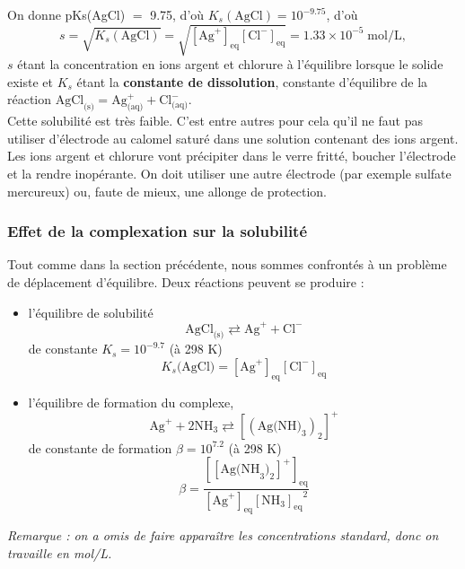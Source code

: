 \documentclass[11pt,a4paper]{report}
\begin{document}
On donne pKs(AgCl) $=$ 9.75, d'où $K_s(\text{AgCl}) = 10^{-9.75}$, d'où
\begin{equation}
	s = \sqrt{K_s(\text{AgCl})} = \sqrt{[\text{Ag}^+]_\text{eq}[\text{Cl}^-]_\text{eq}}
	= 1.33\times10^{-5}\;\text{mol/L},
\end{equation}
$s$ étant la concentration en ions argent et chlorure à l'équilibre lorsque le solide existe et
$K_s$ étant la \textbf{constante de dissolution}, constante d'équilibre de la réaction
$\text{AgCl}_\text{(s)} = \text{Ag}^+_\text{(aq)} + \text{Cl}^-_\text{(aq)}$.\\

Cette solubilité est très faible. C'est entre autres pour cela qu'il ne faut pas utiliser d'électrode au calomel saturé dans une solution contenant des ions argent. Les ions argent et chlorure vont précipiter dans le verre fritté, boucher l'électrode et la rendre inopérante. On doit utiliser une autre électrode (par exemple sulfate mercureux) ou, faute de mieux, une allonge de protection.

\subsubsection*{Effet de la complexation sur la solubilité}

Tout comme dans la section précédente, nous sommes confrontés à un problème de déplacement d'équilibre. Deux réactions peuvent se produire :
\begin{itemize}
	\item l'équilibre de solubilité
		\begin{equation}
			\text{AgCl}_\text{(s)} \rightleftarrows \text{Ag}^+ + \text{Cl}^-
		\end{equation}
		de constante $K_s = 10^{-9.7}$ (à 298 K)
		\begin{equation}
			\boxed{K_s(\text{AgCl)} = [\text{Ag}^+]_\text{eq}[\text{Cl}^-]_\text{eq}}
		\end{equation}
	\item l'équilibre de formation du complexe,
		\begin{equation}
			\text{Ag}^+ + 2\text{NH}_3 \rightleftarrows [(\text{Ag(NH)}_3)_2]^+
		\end{equation}
		de constante de formation $\beta = 10^{7.2}$ (à 298 K)
		\begin{equation}
			\boxed{\beta = \frac{[[\text{Ag(NH}_3)_2]^+]_\text{eq}}{[\text{Ag}^+]_\text{eq}
			{[\text{NH}_3]_\text{eq}}^2}}
		\end{equation}
\end{itemize}
\textit{Remarque : on a omis de faire apparaître les concentrations standard, donc on travaille en mol/L.}
\end{document}
